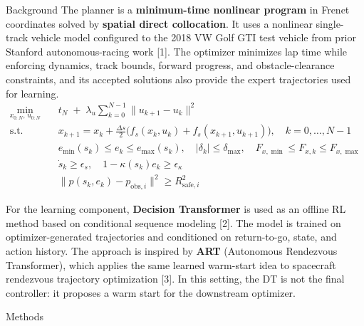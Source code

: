 \documentclass[final]{beamer}
\newlength{\colwidth}
\begin{document}
\begin{frame}[t]
\begin{columns}[t]
\begin{column}{\colwidth}
\begin{block}{Background}
The planner is a \textbf{minimum-time nonlinear program} in Frenet coordinates solved by \textbf{spatial direct collocation}. It uses a nonlinear single-track vehicle model configured to the 2018 VW Golf GTI test vehicle from prior Stanford autonomous-racing work [1]. The optimizer minimizes lap time while enforcing dynamics, track bounds, forward progress, and obstacle-clearance constraints, and its accepted solutions also provide the expert trajectories used for learning.
\begin{align*}
 \min_{x_{0:N},\,u_{0:N}} \quad & t_N \;+\; \lambda_u\sum_{k=0}^{N-1}\lVert u_{k+1}-u_k\rVert^2 \\[4pt]
\text{s.t.} \quad
& x_{k+1} = x_k + \frac{\Delta s}{2}\Big(f_s(x_k,u_k)+f_s(x_{k+1},u_{k+1})\Big), \quad k=0,\dots,N-1 \\
& e_{\min}(s_k)\le e_k\le e_{\max}(s_k),\quad |\delta_k|\le\delta_{\max},\quad F_{x,\min}\le F_{x,k}\le F_{x,\max} \\
& \dot{s}_k \ge \epsilon_s,\quad 1-\kappa(s_k)e_k \ge \epsilon_\kappa \\
& \lVert p(s_k,e_k)-p_{\mathrm{obs},i}\rVert^2 \ge R_{\mathrm{safe},i}^2
\end{align*}

For the learning component, \textbf{Decision Transformer} is used as an offline RL method based on conditional sequence modeling [2]. The model is trained on optimizer-generated trajectories and conditioned on return-to-go, state, and action history. The approach is inspired by \textbf{ART} (Autonomous Rendezvous Transformer), which applies the same learned warm-start idea to spacecraft rendezvous trajectory optimization [3]. In this setting, the DT is not the final controller: it proposes a warm start for the downstream optimizer.
\end{block}

\begin{block}{Methods}
    \vspace{-5pt}

\begin{figure}
\centering
{}
\end{figure}
\end{block}
\end{column}
\end{columns}
\end{frame}
\end{document}
